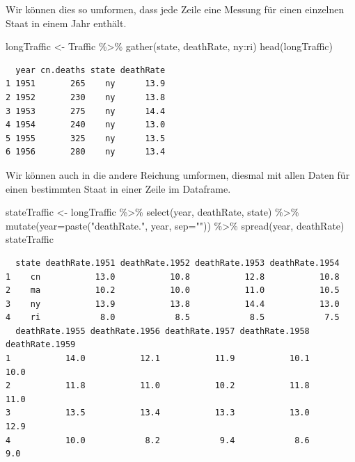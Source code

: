 \documentclass[
  ngerman,
]{scrbook}
\newenvironment{Shaded}{\begin{snugshade}}{\end{snugshade}}
\newcommand{\AttributeTok}[1]{\textcolor[rgb]{0.77,0.63,0.00}{#1}}
\newcommand{\FunctionTok}[1]{\textcolor[rgb]{0.00,0.00,0.00}{#1}}
\newcommand{\NormalTok}[1]{#1}
\newcommand{\OtherTok}[1]{\textcolor[rgb]{0.56,0.35,0.01}{#1}}
\newcommand{\SpecialCharTok}[1]{\textcolor[rgb]{0.00,0.00,0.00}{#1}}
\newcommand{\StringTok}[1]{\textcolor[rgb]{0.31,0.60,0.02}{#1}}
\begin{document}
Wir können dies so umformen, dass jede Zeile eine Messung für einen einzelnen Staat in einem Jahr enthält.

\begin{Shaded}
\begin{Highlighting}[]
\NormalTok{longTraffic }\OtherTok{\textless{}{-}}\NormalTok{ Traffic }\SpecialCharTok{\%\textgreater{}\%}
  \FunctionTok{gather}\NormalTok{(state, deathRate, ny}\SpecialCharTok{:}\NormalTok{ri)}
\FunctionTok{head}\NormalTok{(longTraffic)}
\end{Highlighting}
\end{Shaded}

\begin{verbatim}
  year cn.deaths state deathRate
1 1951       265    ny      13.9
2 1952       230    ny      13.8
3 1953       275    ny      14.4
4 1954       240    ny      13.0
5 1955       325    ny      13.5
6 1956       280    ny      13.4
\end{verbatim}

Wir können auch in die andere Reichung umformen, diesmal mit allen Daten für einen bestimmten Staat in einer Zeile im Dataframe.

\begin{Shaded}
\begin{Highlighting}[]
\NormalTok{stateTraffic }\OtherTok{\textless{}{-}}\NormalTok{ longTraffic }\SpecialCharTok{\%\textgreater{}\%} 
  \FunctionTok{select}\NormalTok{(year, deathRate, state) }\SpecialCharTok{\%\textgreater{}\%}
  \FunctionTok{mutate}\NormalTok{(}\AttributeTok{year=}\FunctionTok{paste}\NormalTok{(}\StringTok{"deathRate."}\NormalTok{, year, }\AttributeTok{sep=}\StringTok{""}\NormalTok{)) }\SpecialCharTok{\%\textgreater{}\%}
  \FunctionTok{spread}\NormalTok{(year, deathRate)}
\NormalTok{stateTraffic}
\end{Highlighting}
\end{Shaded}

\begin{verbatim}
  state deathRate.1951 deathRate.1952 deathRate.1953 deathRate.1954
1    cn           13.0           10.8           12.8           10.8
2    ma           10.2           10.0           11.0           10.5
3    ny           13.9           13.8           14.4           13.0
4    ri            8.0            8.5            8.5            7.5
  deathRate.1955 deathRate.1956 deathRate.1957 deathRate.1958 deathRate.1959
1           14.0           12.1           11.9           10.1           10.0
2           11.8           11.0           10.2           11.8           11.0
3           13.5           13.4           13.3           13.0           12.9
4           10.0            8.2            9.4            8.6            9.0
\end{verbatim}
\end{document}
